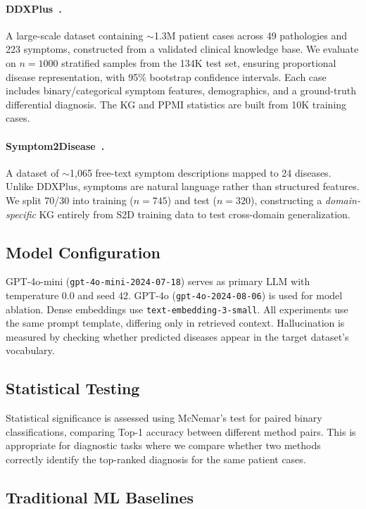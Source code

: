 \documentclass[preprint,12pt]{elsarticle}
\begin{document}
\paragraph{DDXPlus~\cite{fansi2022ddxplus}.} A large-scale dataset containing ${\sim}$1.3M patient cases across 49 pathologies and 223 symptoms, constructed from a validated clinical knowledge base. We evaluate on $n{=}1000$ stratified samples from the 134K test set, ensuring proportional disease representation, with 95\% bootstrap confidence intervals. Each case includes binary/categorical symptom features, demographics, and a ground-truth differential diagnosis. The KG and PPMI statistics are built from 10K training cases.

\paragraph{Symptom2Disease~\cite{gretelai_s2d}.} A dataset of ${\sim}$1,065 free-text symptom descriptions mapped to 24 diseases. Unlike DDXPlus, symptoms are natural language rather than structured features. We split 70/30 into training ($n{=}745$) and test ($n{=}320$), constructing a \emph{domain-specific} KG entirely from S2D training data to test cross-domain generalization.

\subsection{Model Configuration}

GPT-4o-mini (\texttt{gpt-4o-mini-2024-07-18}) serves as primary LLM with temperature 0.0 and seed 42. GPT-4o (\texttt{gpt-4o-2024-08-06}) is used for model ablation. Dense embeddings use \texttt{text-embedding-3-small}. All experiments use the same prompt template, differing only in retrieved context. Hallucination is measured by checking whether predicted diseases appear in the target dataset's vocabulary.

\subsection{Statistical Testing}

Statistical significance is assessed using McNemar's test for paired binary classifications, comparing Top-1 accuracy between different method pairs. This is appropriate for diagnostic tasks where we compare whether two methods correctly identify the top-ranked diagnosis for the same patient cases.

\subsection{Traditional ML Baselines}
\end{document}
